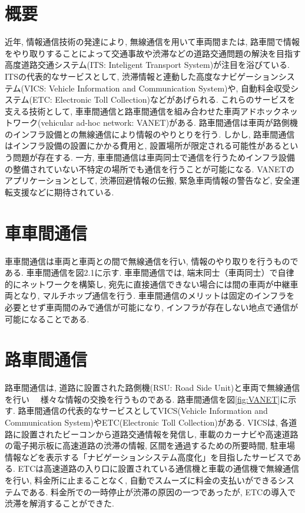 \documentclass[10pt]{jreport}
\begin{document}
\section{概要}
近年, 情報通信技術の発達により, 無線通信を用いて車両間または, 路車間で情報をやり取りすることによって交通事故や渋滞などの道路交通問題の解決を目指す高度道路交通システム(ITS: Inteligent Transport System)が注目を浴びている\cite{1}. ITSの代表的なサービスとして, 渋滞情報と連動した高度なナビゲーションシステム(VICS: Vehicle Information and Communication System)\cite{VICS}や, 自動料金収受システム(ETC: Electronic Toll Collection)\cite{ETC}などがあげられる. これらのサービスを支える技術として, 車車間通信と路車間通信を組み合わせた車両アドホックネットワーク(vehicular ad-hoc network: VANET)がある. 路車間通信は車両が路側機のインフラ設備との無線通信により情報のやりとりを行う. しかし, 路車間通信はインフラ設備の設置にかかる費用と, 設置場所が限定される可能性があるという問題が存在する. 一方, 車車間通信は車両同士で通信を行うためインフラ設備の整備されていない不特定の場所でも通信を行うことが可能になる. VANETのアプリケーションとして, 渋滞回避情報の伝搬, 緊急車両情報の警告など, 安全運転支援などに期待されている. 
\section{車車間通信}
車車間通信は車両と車両との間で無線通信を行い, 情報のやり取りを行うものである. 車車間通信を図2.1に示す. 車車間通信では, 端末同士（車両同士）で自律的にネットワークを構築し, 宛先に直接通信できない場合には間の車両が中継車両となり, マルチホップ通信を行う. 車車間通信のメリットは固定のインフラを必要とせず車両間のみで通信が可能になり, インフラが存在しない地点で通信が可能になることである. 

\section{路車間通信}
路車間通信は, 道路に設置された路側機(RSU: Road Side Unit)と車両で無線通信を行い　
様々な情報の交換を行うものである. 路車間通信を図\ref{fig:VANET}に示す.  路車間通信の代表的なサービスとしてVICS(Vehicle Information and Communication System)やETC(Electronic Toll Collection)がある. VICSは, 各道路に設置されたビーコンから道路交通情報を発信し, 車載のカーナビや高速道路の電子掲示板に高速道路の渋滞の情報, 区間を通過するための所要時間, 駐車場情報などを表示する「ナビゲーションシステム高度化」を目指したサービスである. ETCは高速道路の入り口に設置されている通信機と車載の通信機で無線通信を行い, 料金所に止まることなく, 自動でスムーズに料金の支払いができるシステムである. 料金所での一時停止が渋滞の原因の一つであったが, ETCの導入で渋滞を解消することができた. 
\end{document}
